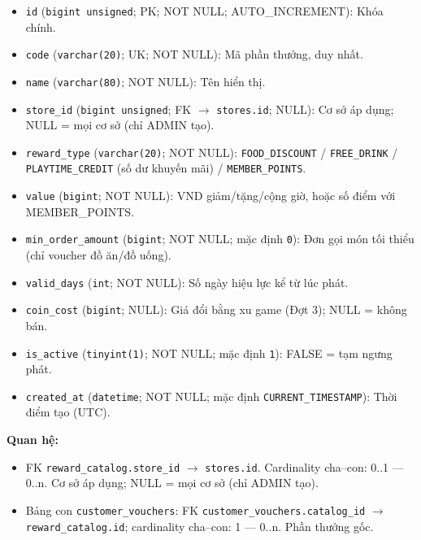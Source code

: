 \begin{itemize}

\item \texttt{id} (\texttt{bigint unsigned}; PK; NOT NULL; AUTO_INCREMENT): Khóa chính.

\item \texttt{code} (\texttt{varchar(20)}; UK; NOT NULL): Mã phần thưởng, duy nhất.

\item \texttt{name} (\texttt{varchar(80)}; NOT NULL): Tên hiển thị.

\item \texttt{store\_id} (\texttt{bigint unsigned}; FK $\rightarrow$ \texttt{stores.id}; NULL): Cơ sở áp dụng; NULL = mọi cơ sở (chỉ ADMIN tạo).

\item \texttt{reward\_type} (\texttt{varchar(20)}; NOT NULL): \texttt{FOOD\_DISCOUNT} / \texttt{FREE\_DRINK} / \texttt{PLAYTIME\_CREDIT} (số dư khuyến mãi) / \texttt{MEMBER\_POINTS}.

\item \texttt{value} (\texttt{bigint}; NOT NULL): VND giảm/tặng/cộng giờ, hoặc số điểm với MEMBER_POINTS.

\item \texttt{min\_order\_amount} (\texttt{bigint}; NOT NULL; mặc định \texttt{0}): Đơn gọi món tối thiểu (chỉ voucher đồ ăn/đồ uống).

\item \texttt{valid\_days} (\texttt{int}; NOT NULL): Số ngày hiệu lực kể từ lúc phát.

\item \texttt{coin\_cost} (\texttt{bigint}; NULL): Giá đổi bằng xu game (Đợt 3); NULL = không bán.

\item \texttt{is\_active} (\texttt{tinyint(1)}; NOT NULL; mặc định \texttt{1}): FALSE = tạm ngưng phát.

\item \texttt{created\_at} (\texttt{datetime}; NOT NULL; mặc định \texttt{CURRENT\_TIMESTAMP}): Thời điểm tạo (UTC).

\end{itemize}

\textbf{Quan hệ:}

\begin{itemize}

\item FK \texttt{reward\_catalog.store\_id} $\rightarrow$ \texttt{stores.id}. Cardinality cha--con: 0..1 — 0..n. Cơ sở áp dụng; NULL = mọi cơ sở (chỉ ADMIN tạo).

\item Bảng con \texttt{customer\_vouchers}: FK \texttt{customer\_vouchers.catalog\_id} $\rightarrow$ \texttt{reward\_catalog.id}; cardinality cha--con: 1 — 0..n. Phần thưởng gốc.

\end{itemize}

